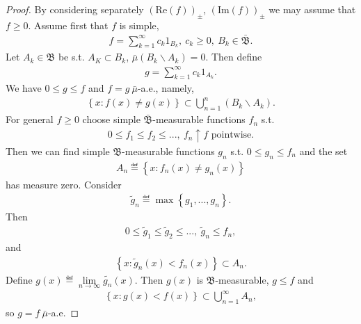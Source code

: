 \begin{proof}
    By considering separately \(\left(\text{Re}(f)\right)_{\pm}\), \(\left(\text{Im}(f)\right)_{\pm}\) we may assume that \(f\geq 0\).
    Assume first that \(f\) is simple, 
    \begin{align*}
        f = \sum\limits_{k=1}^{\infty} c_k1_{B_k}, \ c_k \geq 0, \ B_k\in\bar{\mathfrak{B}}.
    \end{align*}
    Let \(A_k\in \mathfrak{B}\) be s.t. \(A_K\subset B_k\), \(\bar{\mu}(B_k\backslash A_k) = 0\). Then define
    \begin{align*}
        g = \sum\limits_{k=1}^{\infty}c_k 1_{A_k}.
    \end{align*}
    We have \(0\leq g\leq f\) and \(f=g \ \bar{\mu}\)-a.e., namely,
    \begin{align*}
        \left\{ x:f(x)\neq g(x) \right\} \subset \bigcup\limits_{n=1}^{n}\left(B_k\backslash A_k\right).
    \end{align*}
    For general \(f\geq 0\) choose simple \(\bar{\mathfrak{B}}\)-measurable functions \(f_n\) s.t.
    \begin{align*}
        0\leq f_1\leq f_2\leq ..., \ f_n \uparrow f \text{ pointwise.}
    \end{align*}
    Then we can find simple \(\mathfrak{B}\)-measurable functions \(g_n\) s.t. \(0\leq g_n\leq f_n\) and the set 
    \begin{align*}
        A_n \eqdef \left\{ x:f_n(x)\neq g_n(x) \right\}
    \end{align*}
    has measure zero. Consider
    \begin{align*}
        \tilde{g}_n \eqdef \max\left\{ g_1, ..., g_n \right\}.
    \end{align*}
    Then
    \begin{align*}
        0\leq \tilde{g}_1\leq \tilde{g}_2 \leq ..., \ \tilde{g}_n \leq f_n,
    \end{align*}
    and 
    \begin{align*}
        \left\{ x: \tilde{g}_n(x) < f_n(x) \right\} \subset A_n.
    \end{align*}
    Define \(g(x) \eqdef \lim\limits_{n\rightarrow \infty} \tilde{g_n}(x)\). Then \(g(x)\) is \(\mathfrak{B}\)-measurable, \(g\leq f\) and
    \begin{align*}
        \left\{ x : g(x) < f(x) \right\} \subset \bigcup\limits_{n=1}^{\infty} A_n,
    \end{align*}
    so \(g=f \ \bar{\mu}\)-a.e.
\end{proof}
